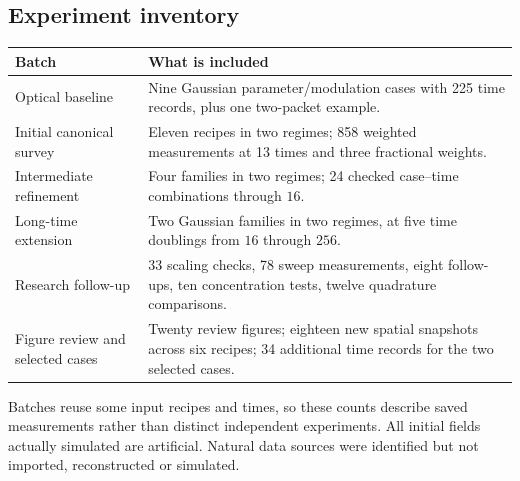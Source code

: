 \documentclass[10pt,letterpaper]{article}
\numberwithin{equation}{section}
\begin{document}
\subsection{Experiment inventory}\label{guide}
\noindent
\begin{tabular}{p{.30\linewidth}p{.63\linewidth}}\toprule
Batch & What is included\\\midrule
Optical baseline & Nine Gaussian parameter/modulation cases with 225 time records,
plus one two-packet example.\\
Initial canonical survey & Eleven recipes in two regimes; 858 weighted measurements
at 13 times and three fractional weights.\\
Intermediate refinement & Four families in two regimes; 24 checked case--time
combinations through $16$.\\
Long-time extension & Two Gaussian families in two regimes, at five time doublings
from $16$ through $256$.\\
Research follow-up & 33 scaling checks, 78 sweep measurements, eight follow-ups,
ten concentration tests, twelve quadrature comparisons.\\
Figure review and selected cases & Twenty review figures; eighteen new spatial
snapshots across six recipes; 34 additional time records for the two selected cases.\\\bottomrule
\end{tabular}

Batches reuse some input recipes and times, so these counts describe saved
measurements rather than distinct independent experiments. All initial fields
actually simulated are artificial. Natural data sources were identified but not
imported, reconstructed or simulated.
\end{document}
